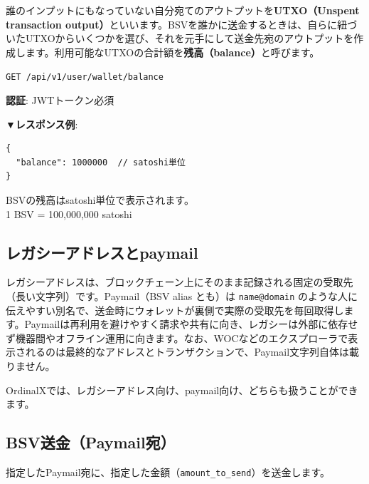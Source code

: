 \documentclass[11pt,a4paper]{ltjsarticle}  %
\begin{document}
誰のインプットにもなっていない自分宛てのアウトプットを\textbf{UTXO（Unspent transaction output）}といいます。BSVを誰かに送金するときは、自らに紐づいたUTXOからいくつかを選び、それを元手にして送金先宛のアウトプットを作成します。利用可能なUTXOの合計額を\textbf{残高（balance）}と呼びます。

\begin{tcolorbox}[colback=blue!5,colframe=blue!50!black,title=エンドポイント]
\texttt{GET /api/v1/user/wallet/balance}
\end{tcolorbox}

\textbf{認証}: JWTトークン必須

\textbf{▼レスポンス例}:
\begin{lstlisting}[style=json]
{
  "balance": 1000000  // satoshi単位
}
\end{lstlisting}

\begin{tcolorbox}[colback=yellow!10,colframe=orange!50!black,title=単位について]
BSVの残高はsatoshi単位で表示されます。\\
1 BSV = 100,000,000 satoshi
\end{tcolorbox}




\subsection{レガシーアドレスとpaymail}

レガシーアドレスは、ブロックチェーン上にそのまま記録される固定の受取先（長い文字列）です。Paymail（BSV alias とも）は \texttt{name@domain} のような人に伝えやすい別名で、送金時にウォレットが裏側で実際の受取先を毎回取得します。Paymailは再利用を避けやすく請求や共有に向き、レガシーは外部に依存せず機器間やオフライン運用に向きます。なお、WOCなどのエクスプローラで表示されるのは最終的なアドレスとトランザクションで、Paymail文字列自体は載りません。

\begin{tcolorbox}[colback=yellow!10,colframe=orange!50!black,title=OrdinalXはどちらも扱える]
OrdinalXでは、レガシーアドレス向け、paymail向け、どちらも扱うことができます。
\end{tcolorbox}

\subsection{BSV送金（Paymail宛）}

指定したPaymail宛に、指定した金額（\verb|amount_to_send|）を送金します。
\end{document}
